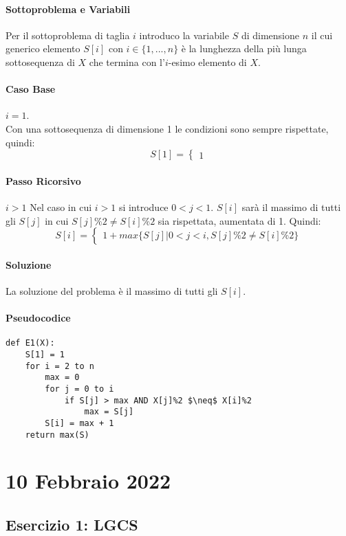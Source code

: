 \documentclass[12pt, a4paper, openany]{book}
\begin{document}
\paragraph*{Sottoproblema e Variabili}
Per il sottoproblema di taglia $i$ introduco la variabile $S$ di dimensione $n$ il cui generico elemento
$S[i]$ con $i\in \{1,...,n\}$ è la lunghezza della più lunga sottosequenza di $X$ che termina con l'$i$-esimo elemento di $X$.

\paragraph*{Caso Base} $i=1$.
\\Con una sottosequenza di dimensione 1 le condizioni sono sempre rispettate, quindi:
$$
	S[1]= \begin{cases}
		1
	\end{cases}
$$
\paragraph*{Passo Ricorsivo} $i>1$
Nel caso in cui $i>1$ si introduce $0<j<1$.
$S[i]$ sarà il massimo di tutti gli $S[j]$ in cui $S[j]\%2 \neq S[i]\%2$ sia rispettata, aumentata di 1.
Quindi:
$$
	S[i]= \begin{cases}
		1 + max\{S[j] | 0 < j < i, S[j]\%2 \neq S[i]\%2 \}
	\end{cases}
$$
\paragraph*{Soluzione}
La soluzione del problema è il massimo di tutti gli $S[i]$.

\paragraph*{Pseudocodice}
\begin{lstlisting}[style=small]
def E1(X):
	S[1] = 1
	for i = 2 to n
		max = 0
		for j = 0 to i
			if S[j] > max AND X[j]%2 $\neq$ X[i]%2
				max = S[j]
		S[i] = max + 1
	return max(S) 
\end{lstlisting}

\section{10 Febbraio 2022}
\subsection{Esercizio 1: LGCS}
\end{document}
